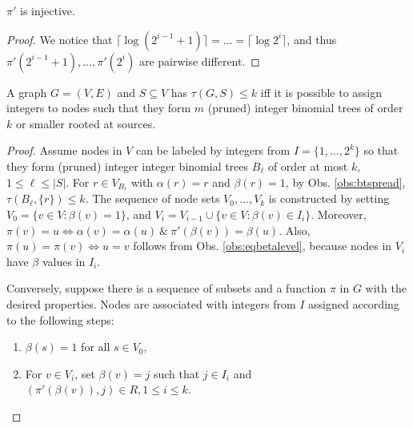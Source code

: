 \begin{observation}\label{obs:eqbetalevel}
$\pi'$ is injective.
\end{observation}
\begin{proof}
We notice that $\lceil\log (2^{i-1}+1)\rceil=\dots =\lceil\log 2^i\rceil$, and thus $\pi'(2^{i-1}+1),\dots,\pi'(2^i)$ are pairwise different.
\end{proof}

\begin{proposition}\label{lem:probeq}
A graph $G=(V,E)$ and $S\subseteq V$ has $\tau(G,S)\leq k$ iff it is possible to assign integers to nodes
such that they form $m$ (pruned) integer binomial trees of order $k$ or smaller rooted at sources.
\end{proposition}
\begin{proof}
Assume nodes in $V$ can be labeled by integers from $I=\{1,\dots,2^k\}$ so that they form (pruned) integer integer binomial trees $B_\ell$ of order at most $k$, $1\leq\ell\leq |S|$.
For $r\in V_{B_\ell}$ with $\alpha(r)=r$ and $\beta(r)=1$, by Obs. \ref{obs:btspread}, $\tau(B_\ell,\{r\})\leq k$.
The sequence of node sets $V_0,\dots,V_k$ is constructed by setting $V_0=\{v\in V:\beta(v)=1\}$, and $V_{i}=V_{i-1}\cup\{v\in V: \beta(v)\in I_i\}$.
Moreover, $\pi(v)=u\Leftrightarrow \alpha(v)=\alpha(u)~\&~\pi'(\beta(v))=\beta(u)$.
Also, $\pi(u)=\pi(v)\Leftrightarrow u=v$ follows from Obs. \ref{obs:eqbetalevel}, because nodes in $V_i$ have $\beta$ values in $I_i$.

Conversely, suppose there is a sequence of subsets and a function $\pi$ in $G$ with the desired properties.
Nodes are associated with integers from $I$ assigned according to the following steps:
\begin{enumerate}
\item $\beta(s)=1$ for all $s\in V_0$,
\item For $v\in V_i$, set $\beta(v)=j$ such that $j\in I_i$ and $(\pi'(\beta(v)),j)\in R, 1\leq i\leq k$.
\end{enumerate}
\end{proof}
